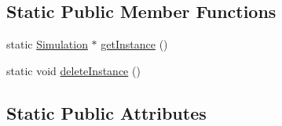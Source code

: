 \subsection*{Static Public Member Functions}
\begin{DoxyCompactItemize}
\item 
static \hyperlink{classtraci__api_1_1_simulation}{Simulation} $\ast$ \hyperlink{classtraci__api_1_1_simulation_a5bd3febd1571525c2dac2b68e37f694e}{get\+Instance} ()
\item 
static void \hyperlink{classtraci__api_1_1_simulation_a952c6f62a424d4f8d3ee016dc8c935bd}{delete\+Instance} ()
\end{DoxyCompactItemize}
\subsection*{Static Public Attributes}
